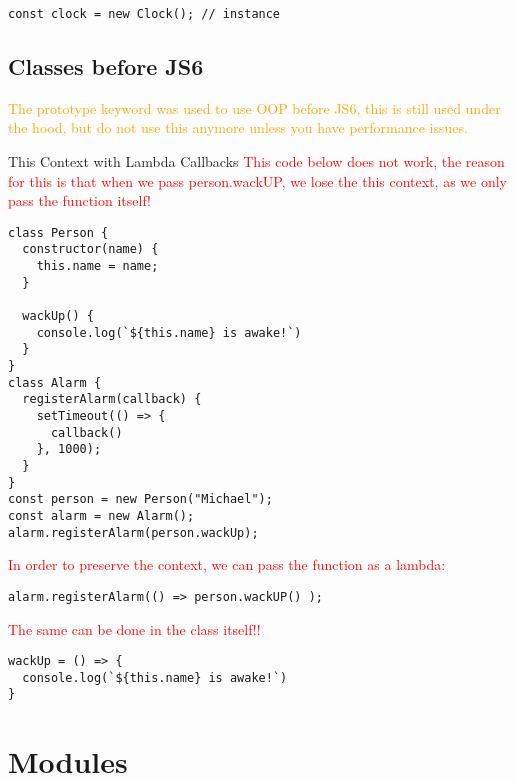 \documentclass[main.tex,fontsize=6pt,paper=a4,paper=landscape,DIV=calc,]{scrartcl}
\begin{document}
\begin{multicols*}{4}
\begin{lstlisting}
const clock = new Clock(); // instance
\end{lstlisting}
\vspace{2mm}

\subsection{Classes before JS6}  
\textcolor{orange}{The prototype keyword was used to use OOP before JS6, this is still used under the hood, but do not use this anymore unless you have performance issues.}

This Context with Lambda Callbacks 
\textcolor{red}{This code below does not work, the reason for this is that when we pass person.wackUP, we lose the this context, as we only pass the function itself!}\newline
\vspace{-2mm}
\begin{lstlisting}
class Person {
  constructor(name) {
    this.name = name;
  }

  wackUp() {
    console.log(`${this.name} is awake!`)
  }
}
class Alarm {
  registerAlarm(callback) {
    setTimeout(() => {
      callback()
    }, 1000);
  }
}
const person = new Person("Michael");
const alarm = new Alarm();
alarm.registerAlarm(person.wackUp);
\end{lstlisting}
\vspace{2mm}
\textcolor{red}{In order to preserve the context, we can pass the function as a lambda:}\newline
\vspace{-2mm}
\begin{lstlisting}
alarm.registerAlarm(() => person.wackUP() );
\end{lstlisting}
\vspace{2mm} 
\textcolor{red}{The same can be done in the class itself!!}\newline
\vspace{-2mm}
\begin{lstlisting}
wackUp = () => {
  console.log(`${this.name} is awake!`)
}
\end{lstlisting}
\vspace{2mm}

\section{Modules}


\end{multicols*}
\end{document}
